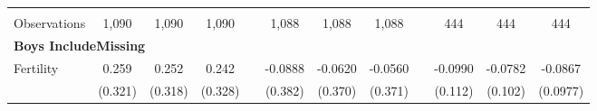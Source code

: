 \begin{landscape}
\begin{table}[htpb!]
\begin{center}
\begin{tabular}{lcccp{2mm}cccp{2mm}ccc}
\begin{footnotesize}\end{footnotesize}&\begin{footnotesize}\end{footnotesize}&\begin{footnotesize}\end{footnotesize}&\begin{footnotesize}\end{footnotesize}&\begin{footnotesize}\end{footnotesize}&\begin{footnotesize}\end{footnotesize}&\begin{footnotesize}\end{footnotesize}&\begin{footnotesize}\end{footnotesize}&\begin{footnotesize}\end{footnotesize}&\begin{footnotesize}\end{footnotesize}&\begin{footnotesize}\end{footnotesize}&\begin{footnotesize}\end{footnotesize}\\Observations&1,090&1,090&1,090&&1,088&1,088&1,088&&444&444&444\\
\multicolumn{12}{l}{\textbf{Boys IncludeMissing}}\\ 
Fertility&0.259&0.252&0.242&&-0.0888&-0.0620&-0.0560&&-0.0990&-0.0782&-0.0867\\
&(0.321)&(0.318)&(0.328)&&(0.382)&(0.370)&(0.371)&&(0.112)&(0.102)&(0.0977)\\

\end{tabular}
\end{center}
\end{table}
\end{landscape}
